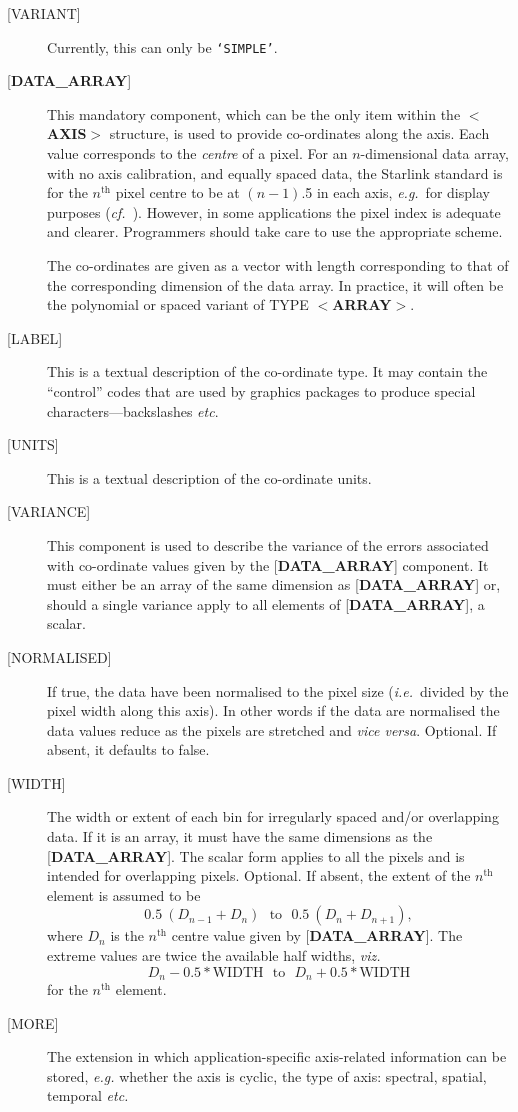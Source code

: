 \documentclass[twoside,11pt,nolof,noabs]{starlink}
\begin{document}
\begin{description}
\item [{[}VARIANT{]}]
Currently, this can only be \texttt{`SIMPLE'}.
\item [{[}\textbf{DATA\_ARRAY}{]}]
This mandatory component, which
can be the only item within the $<$\textbf{AXIS}$>$ structure,
is used to provide co-ordinates along the axis.
Each value corresponds to the \textit{centre} of a pixel.  For an
$n$-dimensional data array, with no axis calibration, and equally spaced
data, the Starlink standard is for the $n^{\mathrm{th}}$ pixel centre to be at
$(n-1)$.5 in each axis, \textit{e.g.}\  for display purposes
(\textit{cf.}\  ). However, in some applications the pixel
index is adequate and clearer.  Programmers should take care to use
the appropriate scheme.

The co-ordinates are given as
a vector with length corresponding to that of the corresponding
dimension of the data array. In practice, it will often be
the polynomial or spaced variant of TYPE \mbox{$<$\textbf{ARRAY}$>$}.

\item [{[}LABEL{]}]
This is a textual description of the co-ordinate type.  It may
contain the ``control'' codes that are used by graphics packages
to produce special characters---backslashes \textit{etc}.
\item [{[}UNITS{]}]
This is a textual description of the co-ordinate units.
\item [{[}VARIANCE{]}]
This component is used to describe the variance of the
errors associated with co-ordinate
values given by the {[}\textbf{DATA\_ARRAY}{]} component.
It must either be an array of
the same dimension as {[}\textbf{DATA\_ARRAY}{]} or,
should a single variance apply to all elements of {[}\textbf{DATA\_ARRAY}{]},
a scalar.
\item [{[}NORMALISED{]}]
If true, the data have been normalised to the pixel size
(\textit{i.e.}\ divided by the pixel width along this axis).
In other words if the data are
normalised the data values reduce as the pixels are stretched and \textit{vice versa}. Optional. If absent, it defaults to false.
\item [{[}WIDTH{]}]
The width or extent of each bin for irregularly spaced
and/or overlapping data.
If it is an array, it must have
the same dimensions as the {[}\textbf{DATA\_ARRAY}{]}.
The scalar form applies to all the pixels and is intended for overlapping
pixels.  Optional.  If absent, the extent of the $n^{\mathrm{th}}$
element is assumed to be
$$ 0.5~(D_{n-1}+D_n)~~~\mathrm{to}~~~0.5~(D_n+D_{n+1}) , $$
where $D_n$ is the $n^{\mathrm{th}}$ centre
value given by {[}\textbf{DATA\_ARRAY}{]}. The
extreme values are twice the available half widths, \textit{viz.}
$$ D_n - 0.5 * \mathrm{WIDTH} ~~~ \mathrm{to} ~~~ D_n + 0.5 * \mathrm{WIDTH} $$
for the $n^{\mathrm{th}}$ element.
\item [{[}MORE{]}] The extension in which application-specific
axis-related information can be stored,
\textit{e.g.} whether the axis is cyclic, the type of axis: spectral,
spatial, temporal \textit{etc.}
\end{description}
\end{document}
